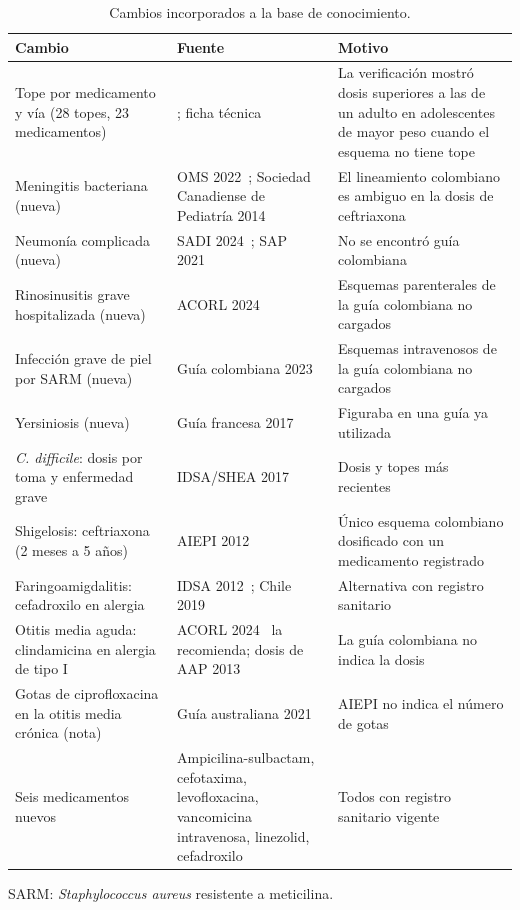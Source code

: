 \documentclass[10pt,a4paper]{article}
\begin{document}
\begin{table}[htbp]
\centering
\caption{Cambios incorporados a la base de conocimiento.}
\footnotesize
\begin{tabularx}{\textwidth}{@{}L{4.4cm}L{4.2cm}X@{}}
\toprule
Cambio & Fuente & Motivo \\
\midrule
Tope por medicamento y vía (28 topes, 23 medicamentos) & \citep{backman2025,bradley2011,lesaux2014,niceng111,buettcher2021,stevens2014,sappiel2014,mcdonald2018,cohen2017}; ficha técnica & La verificación mostró dosis superiores a las de un adulto en adolescentes de mayor peso cuando el esquema no tiene tope \\
Meningitis bacteriana (nueva) & OMS 2022~\citep{aware2022}; Sociedad Canadiense de Pediatría 2014~\citep{lesaux2014} & El lineamiento colombiano es ambiguo en la dosis de ceftriaxona \\
Neumonía complicada (nueva) & SADI 2024~\citep{sadi2024}; SAP 2021~\citep{sapiras2021} & No se encontró guía colombiana \\
Rinosinusitis grave hospitalizada (nueva) & ACORL 2024~\citep{acorlrs2024} & Esquemas parenterales de la guía colombiana no cargados \\
Infección grave de piel por SARM (nueva) & Guía colombiana 2023~\citep{acin2023} & Esquemas intravenosos de la guía colombiana no cargados \\
Yersiniosis (nueva) & Guía francesa 2017~\citep{cohen2017} & Figuraba en una guía ya utilizada \\
\emph{C. difficile}: dosis por toma y enfermedad grave & IDSA/SHEA 2017~\citep{mcdonald2018} & Dosis y topes más recientes \\
Shigelosis: ceftriaxona (2 meses a 5 años) & AIEPI 2012~\citep{aiepi2012} & Único esquema colombiano dosificado con un medicamento registrado \\
Faringoamigdalitis: cefadroxilo en alergia & IDSA 2012~\citep{shulman2012}; Chile 2019~\citep{chilefaa2019} & Alternativa con registro sanitario \\
Otitis media aguda: clindamicina en alergia de tipo I & ACORL 2024~\citep{acorloma2024} la recomienda; dosis de AAP 2013~\citep{lieberthal2013} & La guía colombiana no indica la dosis \\
Gotas de ciprofloxacina en la otitis media crónica (nota) & Guía australiana 2021~\citep{leach2021} & AIEPI no indica el número de gotas \\
Seis medicamentos nuevos & Ampicilina-sulbactam, cefotaxima, levofloxacina, vancomicina intravenosa, linezolid, cefadroxilo & Todos con registro sanitario vigente \\
\bottomrule
\end{tabularx}

\vspace{2pt}
\begin{minipage}{0.95\textwidth}\footnotesize
SARM: \emph{Staphylococcus aureus} resistente a meticilina.
\end{minipage}
\end{table}
\end{document}
